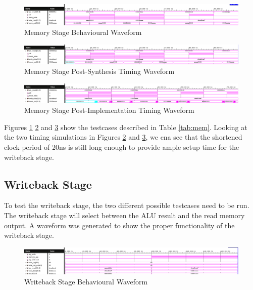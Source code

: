\documentclass[CMPE]{../KGCOEReport}
\begin{document}
    \begin{figure}[h!]
        \centering
        \includegraphics[width=\textwidth]{img/memory_stage_behav}
        \caption{Memory Stage Behavioural Waveform}
        \label{fig:mem_behav}
    \end{figure}
    \begin{figure}[h!]
        \centering
        \includegraphics[width=\textwidth]{img/memory_stage_synth}
        \caption{Memory Stage Post-Synthesis Timing Waveform}
        \label{fig:mem_synth}
    \end{figure}
    \begin{figure}[h!]
        \centering
        \includegraphics[width=\textwidth]{img/memory_stage_impl}
        \caption{Memory Stage Post-Implementation Timing Waveform}
        \label{fig:mem_impl}
    \end{figure}
    
    Figures \ref{fig:mem_behav} \ref{fig:mem_synth} and \ref{fig:mem_impl}
    show the testcases described in Table \ref{tab:mem}. Looking at the two
    timing simulations in Figures \ref{fig:mem_synth} and \ref{fig:mem_impl},
    we cna see that the shortened clock period of 20ns is still long enough
    to provide ample setup time for the writeback stage.

    \subsection*{Writeback Stage}

	To test the writeback stage, the two different possible testcases need
	to be run. The writeback stage will select between the ALU result and the
	read memory output. A waveform was generated to show the proper
	functionality of the writeback stage.
	
	\begin{figure}[h!]
        \centering
        \includegraphics[width=\textwidth]{img/writeback_stage_behav}
        \caption{Writeback Stage Behavioural Waveform}
        \label{fig:writeback}
    \end{figure}
    
\end{document}
